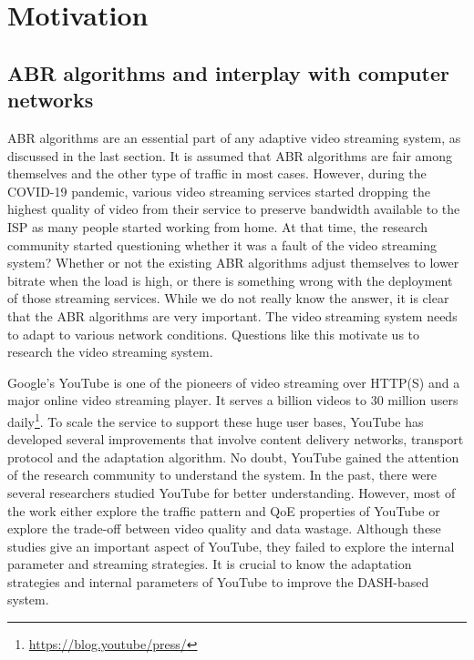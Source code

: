 \section{Motivation}
\subsection{ABR algorithms and interplay with computer networks}
ABR algorithms are an essential part of any adaptive video streaming system, as discussed in the last section. It is assumed that ABR algorithms are fair among themselves and the other type of traffic in most cases. However, during the COVID-19 pandemic, various video streaming services started dropping the highest quality of video from their service to preserve bandwidth available to the ISP as many people started working from home. At that time, the research community started questioning whether it was a fault of the video streaming system? Whether or not the existing ABR algorithms adjust themselves to lower bitrate when the load is high, or there is something wrong with the deployment of those streaming services. While we do not really know the answer, it is clear that the ABR algorithms are very important. The video streaming system needs to adapt to various network conditions. Questions like this motivate us to research the video streaming system.

Google's YouTube is one of the pioneers of video streaming over HTTP(S) and a major online video streaming player. It serves a billion videos to 30 million users daily\footnote{\url{https://blog.youtube/press/}}. To scale the service to support these huge user bases, YouTube has developed several improvements that involve content delivery networks, transport protocol and the adaptation algorithm. No doubt, YouTube gained the attention of the research community to understand the system. In the past, there were several researchers studied YouTube for better understanding. However, most of the work either explore the traffic pattern and QoE properties of YouTube\cite{gill2007youtube,krishnappa2013dashing,wamser2016modeling,wamser2015poster,6757893ieeeexp,7129790ieeeexp} or explore the trade-off between video quality and data wastage\cite{sieber2015cost,seufert2015youtube,sieber2016sacrificing}. Although these studies give an important aspect of YouTube, they failed to explore the internal parameter and streaming strategies. It is crucial to know the adaptation strategies and internal parameters of YouTube to improve the DASH-based system.

